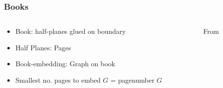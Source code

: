 \documentclass[english]{beamer}
\begin{document}
\begin{frame}
  \frametitle{Books}
  \begin{columns}
    \begin{column}{0.5\textwidth}
      \begin{itemize}
        \item Book: half-planes glued on boundary
        \item Half Planes: Pages
        \item Book-embedding: Graph on book
        \item Smallest no. pages to embed $G$ = pagenumber $G$
      \end{itemize}
    \end{column}
    \pause
    \begin{column}{0.5\textwidth}
      \begin{figure}
        \centering
        
        \caption{From \textcite{eppsteinBookEmbedding2014}}
      \end{figure}
    \end{column}
  \end{columns}
\end{frame}
\end{document}
